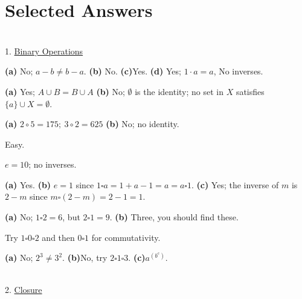 \documentclass[12pt]{book}
\theoremstyle{definition}
\begin{document}
\section{Selected Answers}


~\\

{\Large 1. \underline{Binary Operations}}

\begin{oddenumerate}
	\item \textbf{(a)} No; $ a-b \neq b-a $. \textbf{(b)} No. \textbf{(c)}Yes.
	\textbf{(d)} Yes; $ 1\cdot a=a$, No inverses. 
	
	\item \textbf{(a)} Yes; $ A\cup B= B\cup A $ \textbf{(b)} No; $\emptyset$ is the identity; no set in $ X $ satisfies $ \{a\}\cup X=\emptyset $.
	
	\item \textbf{(a)} $ 2\circ5 =175;~ 3\circ2=625 $ \textbf{(b)} No; no identity.
	
	\item Easy.
	
	\item $ e=10 $; no inverses.
	
	\item \textbf{(a)} Yes. \textbf{(b)} $ e=1 $ since $ 1 \square a= 1+a-1=a=a\square 1 $. \textbf{(c)} Yes; the inverse of $ m $ is $ 2-m $ since $ m\square(2-m)=2-1=1. $
	
	\item \textbf{(a)} No; $ 1\square 2=6 $, but $ 2\square 1=9 $. \textbf{(b)} Three, you should find these.
	
	\item Try $ 1\square 0 \square 2 $ and then $ 0 \square 1 $ for commutativity. 
	
	\item \textbf{(a)} No; $ 2^3\neq 3^2 $. \textbf{(b)}No, try $ 2\square1\square3 $. \textbf{(c)}$ a^{(b^c)}. $
	
	
\end{oddenumerate}


~\\[.1in]
{\Large 2. \underline{Closure}}
\end{document}
